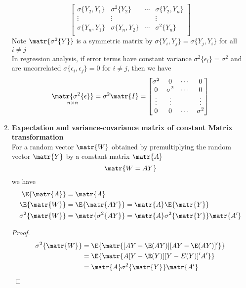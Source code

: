 \documentclass[11pt]{article}
\begin{document}
\begin{defn*}
\begin{enumerate}
\[\begin{bmatrix}
                \sigma\{Y_2, Y_1\} & \sigma^2\{ Y_2 \} & \cdots & \sigma\{ Y_2, Y_n \} \\
                \vdots & \vdots & & \vdots \\
                \sigma\{ Y_n, Y_1 \} & \sigma\{ Y_n, Y_2 \} & \cdots & \sigma^2\{ Y_n \} \\ 
            \end{bmatrix}
        \]
        Note $\matr{\sigma^2\{Y\}}$ is a symmetric matrix by $\sigma\{ Y_i, Y_j \} = \sigma\{ Y_j, Y_i\}$ for all $i\neq j$\\
        In regression analysis, if error terms have constant variance $\sigma^2\{ \epsilon_i \} = \sigma^2$ and are uncorrelated $\sigma\{ \epsilon_i, \epsilon_j \} = 0$ for $i\neq j$, then we have 
        \[
            \underset{n \times n}{\matr{\sigma^2\{ \epsilon \}}} = 
            \sigma^2 \matr{I} = 
            \begin{bmatrix}
                \sigma^2 & 0 & \cdots & 0 \\
                0 & \sigma^2 & \cdots & 0 \\
                \vdots & \vdots & & \vdots \\
                0 & 0 & \cdots & \sigma^2 \\ 
            \end{bmatrix}
        \]
        \item \textbf{Expectation and variance-covariance matrix of constant Matrix transformation} \\
        For a random vector $\matr{W}$ obtained by premultiplying the random vector $\matr{Y}$ by a constant matrix $\matr{A}$ 
        \[
            \matr{W = AY}
        \]
        we have 
        \begin{align*}
            \E\{ \matr{A} \} &= \matr{A} \\
            \E\{ \matr{W} \} &= \E\{ \matr{AY} \} = \matr{A} \E\{ \matr{Y} \} \\
            \sigma^2\{ \matr{W} \} &= \matr{ \sigma^2\{ AY \} }= \matr{A} \sigma^2\{ \matr{Y}\} \matr{A'} \\
        \end{align*}
        \begin{proof}
            \begin{align*}
                \sigma^2\{ \matr{W} \} 
                &= \E\{ \matr{[AY - \E(AY)][AY - \E(AY)]'} \} \\
                &= \E\{ \matr{A[Y-\E(Y)][Y-E(Y)]'A'} \}\\
                &= \matr{A} \sigma^2\{ \matr{Y} \} \matr{A'}
            \end{align*}
        \end{proof}
    \end{enumerate}
\end{defn*}
\end{document}
